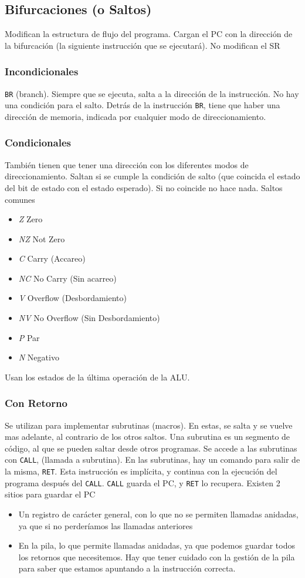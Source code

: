 \documentclass[a4paper,11pt,spanish]{report}
\begin{document}
\subsection{Bifurcaciones (o Saltos)}
Modifican la estructura de flujo del programa. Cargan el PC con la dirección de la bifurcación (la siguiente instrucción que se ejecutará). No modifican el SR
\subsubsection{Incondicionales} 
\verb|BR| (branch). Siempre que se ejecuta, salta a la dirección de la instrucción. No hay una condición para el salto. Detrás de la instrucción \verb|BR|, tiene que haber una dirección de memoria, indicada por cualquier modo de direccionamiento.
\subsubsection{Condicionales}
También tienen que tener una dirección con los diferentes modos de direccionamiento. Saltan si se cumple la condición de salto (que coincida el estado del bit de estado con el estado esperado). Si no coincide no hace nada.
Saltos comunes
\begin{itemize}
\item \emph{Z} \textrightarrow Zero
\item \emph{NZ} \textrightarrow Not Zero
\item \emph{C} \textrightarrow Carry (Accareo)
\item \emph{NC} \textrightarrow No Carry (Sin acarreo)
\item \emph{V} \textrightarrow Overflow (Desbordamiento)
\item \emph{NV} \textrightarrow No Overflow (Sin Desbordamiento)
\item \emph{P} \textrightarrow Par
\item \emph{N} \textrightarrow Negativo
\end{itemize}
Usan los estados de la última operación de la ALU.
\subsubsection{Con Retorno}
Se utilizan para implementar subrutinas (macros). En estas, se salta y se vuelve mas adelante, al contrario de los otros saltos.
Una subrutina es un segmento de código, al que se pueden saltar desde otros programas. Se accede a las subrutinas con \verb|CALL|, (llamada a subrutina). En las subrutinas, hay un comando para salir de la misma, \verb|RET|. Esta instrucción es implícita, y continua con la ejecución del programa después del \verb|CALL|.
\verb|CALL| guarda el PC, y \verb|RET| lo recupera. Existen 2 sitios para guardar el PC
\begin{itemize}
\item Un registro de carácter general, con lo que no se permiten llamadas anidadas, ya que si no perderíamos las llamadas anteriores
\item En la pila, lo que permite llamadas anidadas, ya que podemos guardar todos los retornos que necesitemos. Hay que tener cuidado con la gestión de la pila para saber que estamos apuntando a la instrucción correcta.
\end{itemize}
\end{document}
